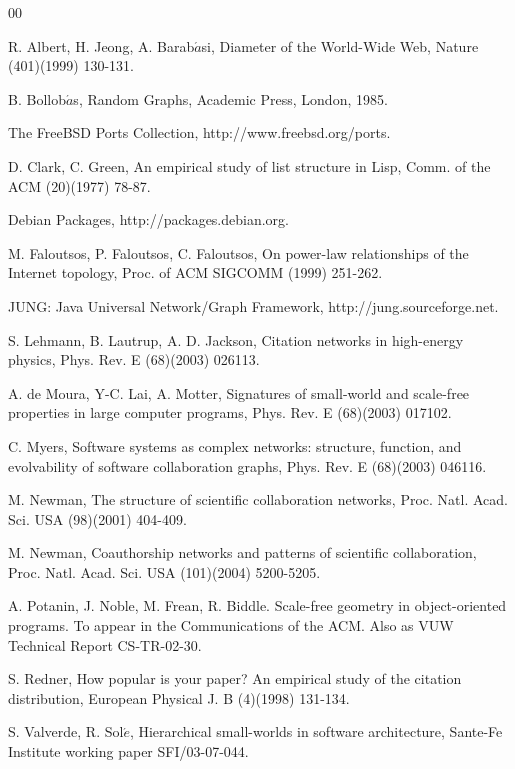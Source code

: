 \documentclass{elsart}
\begin{document}
\begin{thebibliography}{00}

R. Albert, H. Jeong, A. Barab$\acute{a}$si, Diameter of the World-Wide Web, Nature (401)(1999) 130-131.

B. Bollob$\acute{a}$s, Random Graphs, Academic Press, London, 1985.

The FreeBSD Ports Collection, http://www.freebsd.org/ports.

D. Clark, C. Green, An empirical study of list structure in Lisp, Comm. of the ACM (20)(1977) 78-87.

Debian Packages, http://packages.debian.org.

M. Faloutsos, P. Faloutsos, C. Faloutsos,  On power-law relationships of the Internet topology, Proc. of ACM SIGCOMM 
(1999) 251-262.

JUNG: Java Universal Network/Graph Framework, http://jung.sourceforge.net.

S. Lehmann, B. Lautrup, A. D. Jackson, Citation networks in high-energy physics, Phys. Rev. E (68)(2003) 026113.

A. de Moura, Y-C. Lai, A. Motter, Signatures of small-world and scale-free properties in large computer programs,  
Phys. Rev. E (68)(2003) 017102.

C. Myers, Software systems as complex networks: structure, function, and evolvability of software collaboration 
graphs, Phys. Rev. E (68)(2003) 046116.

M. Newman, The structure of scientific collaboration networks, Proc. Natl. Acad. Sci. USA (98)(2001) 404-409.

M. Newman, Coauthorship networks and patterns of scientific collaboration, Proc. Natl. Acad. Sci. USA (101)(2004) 5200-5205.

A. Potanin, J. Noble, M. Frean, R. Biddle. Scale-free geometry in object-oriented programs. To appear in the 
Communications of the ACM. Also as VUW Technical Report CS-TR-02-30.

S. Redner, How popular is your paper? An empirical study of the citation distribution, European Physical J. B 
(4)(1998) 131-134.

S. Valverde, R. Sol$\acute{e}$, Hierarchical small-worlds in software architecture, Sante-Fe Institute working 
paper SFI/03-07-044.


\end{thebibliography}
\end{document}
